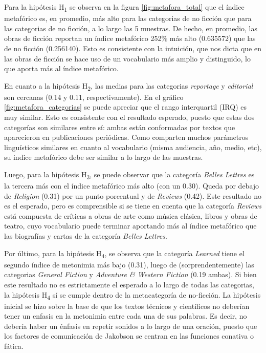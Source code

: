 \documentclass[12pt,letterpaper,twoside]{article}
\begin{document}
Para la hipótesis H\textsubscript{1} se observa en la figura
\ref{fig:metafora_total} que el índice metafórico es, en promedio, más
alto para las categorias de no ficción que para las categorias de no
ficción, a lo largo las 5 muestras. De hecho, en promedio, las obras
de ficción reportan un índice metafórico 252\% más alto (0.635572) que
las de no ficción (0.256140). Esto es consistente con la intuición,
que nos dicta que en las obras de ficción se hace uso de un
vocabulario más amplio y distinguido, lo que aporta más al índice
metafórico.

En cuanto a la hipótesis H\textsubscript{2}, las medias para las categorias
\emph{reportage} y \emph{editorial} son cercanas (0.14 y 0.11,
respectivamente). En el gráfico \ref{fig:metafora_categorias} se puede
apreciar que el rango interquartil (IRQ) es muy similar. Esto es
consistente con el resultado esperado, puesto que estas dos categorías
son similares entre sí: ambas están conformadas por textos que
aparecieron en publicaciones periódicas. Como comparten muchos
parámetros linguísticos similares en cuanto al vocabulario (misma
audiencia, año, medio, etc), su indice metafórico debe ser similar a
lo largo de las muestras.

Luego, para la hipótesis H\textsubscript{3}, se puede observar que la categoría
\emph{Belles Lettres} es la tercera más con el índice metafórico más alto
(con un 0.30). Queda por debajo de \emph{Religion} (0.31) por un punto porcentual y de
\emph{Reviews} (0.42). Este resultado no es el esperado, pero es
comprensible si se tiene en cuenta que la categoría \emph{Reviews} está
compuesta de críticas a obras de arte como música clásica, libros y
obras de teatro, cuyo vocabulario puede terminar aportando más al
índice metafórico que las biografías y cartas de la categoría \emph{Belles
Lettres}.

Por último, para la hipótesis H\textsubscript{4}, se observa que la categoría
\emph{Learned} tiene el segundo índice de metonimia más bajo (0.31), luego
de (sorprendentemente) las categorias \emph{General Fiction} y \emph{Adventure \&
Western Fiction} (0.19 ambas). Si bien este resultado no es
estrictamente el esperado a lo largo de todas las categorias, la
hipótesis H\textsubscript{4} sí se cumple dentro de la metacategoría de
no-ficción. La hipótesis inicial se hizo sobre la base de que los
textos técnicos y científicos no deberían tener un enfasis en la
metonimia entre cada una de sus palabras.  Es decir, no debería haber
un énfasis en repetir sonidos a lo largo de una oración, puesto que
los factores de comunicación de Jakobson se centran en las funciones
conativa o fática.
\end{document}
